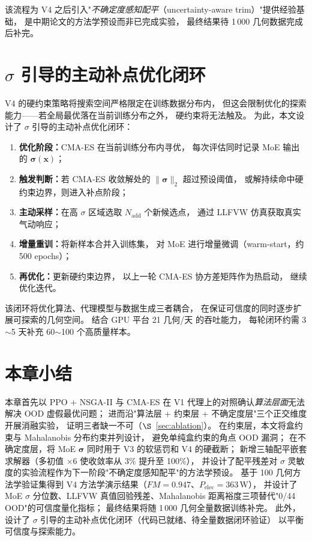 该流程为 V4 之后引入"\emph{不确定度感知配平}（uncertainty-aware trim）"提供经验基础，
是中期论文的方法学预设而非已完成实验，
最终结果待 1\,000 几何数据完成后补完。

\section{$\sigma$ 引导的主动补点优化闭环}

V4 的硬约束策略将搜索空间严格限定在训练数据分布内，
但这会限制优化的探索能力——若全局最优落在当前训练分布之外，
硬约束将无法触及。
为此，本文设计了 $\sigma$ 引导的主动补点优化闭环：

\begin{enumerate}
  \item \textbf{优化阶段：}CMA-ES 在当前训练分布内寻优，
        每次评估同时记录 MoE 输出的 $\boldsymbol{\sigma}(\mathbf{x})$；
  \item \textbf{触发判断：}若 CMA-ES 收敛解处的 $\|\boldsymbol{\sigma}\|_2$ 超过预设阈值，
        或解持续命中硬约束边界，则进入补点阶段；
  \item \textbf{主动采样：}在高 $\sigma$ 区域选取 $N_{\text{add}}$ 个新候选点，
        通过 LLFVW 仿真获取真实气动响应；
  \item \textbf{增量重训：}将新样本合并入训练集，
        对 MoE 进行增量微调（warm-start，约 500 epochs）；
  \item \textbf{再优化：}更新硬约束边界，
        以上一轮 CMA-ES 协方差矩阵作为热启动，
        继续优化迭代。
\end{enumerate}

该闭环将优化算法、代理模型与数据生成三者耦合，
在保证可信度的同时逐步扩展可探索的几何空间。
结合 GPU 平台 21 几何/天 的吞吐能力，
每轮闭环约需 3$\sim$5 天补充 60$\sim$100 个高质量样本。

\section{本章小结}

本章首先以 PPO + NSGA-II 与 CMA-ES 在 V1 代理上的对照确认\emph{算法层面}无法解决 OOD 虚假最优问题；
进而沿"算法层 + 约束层 + 不确定度层"三个正交维度开展消融实验，
证明三者缺一不可（$\S$~\ref{sec:ablation}）。
在约束层，本文将盒约束与 Mahalanobis 分布约束并列设计，
避免单纯盒约束的角点 OOD 漏洞；
在不确定度层，将 MoE $\boldsymbol{\sigma}$ 同时用于 V3 的软惩罚和 V4 的硬截断；
新增三轴配平嵌套求解器（多初值 $\times 6$ 使收敛率从 3\% 提升至 100\%），
并设计了配平残差对 $\sigma$ 灵敏度的实验流程作为下一阶段"不确定度感知配平"的方法学预设。
基于 100 几何方法学验证集得到 V4 方法学演示结果（$FM = 0.947$、$P_{\text{elec}} = 363\,\text{W}$），
并设计了 MoE $\sigma$ 分位数、LLFVW 真值回验残差、Mahalanobis 距离裕度三项替代"0/44 OOD"的可信度量化指标；
最终结果将随 1\,000 几何全量数据训练补完。
此外，设计了 $\sigma$ 引导的主动补点优化闭环（代码已就绪、待全量数据闭环验证）
以平衡可信度与探索能力。
